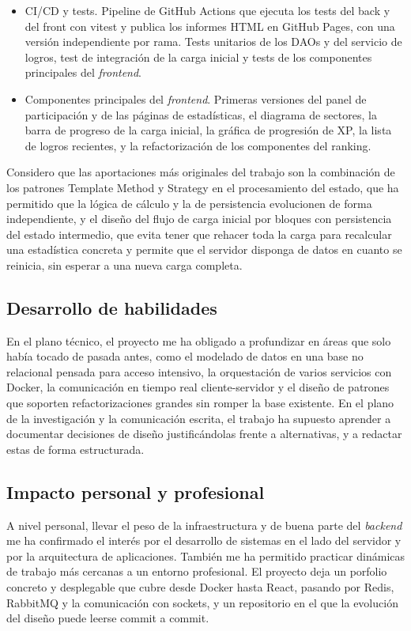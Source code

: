 \begin{itemize}
    \item CI/CD y tests. Pipeline de GitHub Actions que ejecuta los tests del back y del front con vitest y publica los informes HTML en GitHub Pages, con una versión independiente por rama. Tests unitarios de los DAOs y del servicio de logros, test de integración de la carga inicial y tests de los componentes principales del \textit{frontend}.
    \item Componentes principales del \textit{frontend}. Primeras versiones del panel de participación y de las páginas de estadísticas, el diagrama de sectores, la barra de progreso de la carga inicial, la gráfica de progresión de XP, la lista de logros recientes, y la refactorización de los componentes del ranking.
\end{itemize}

Considero que las aportaciones más originales del trabajo son la combinación de los patrones Template Method y Strategy en el procesamiento del estado, que ha permitido que la lógica de cálculo y la de persistencia evolucionen de forma independiente, y el diseño del flujo de carga inicial por bloques con persistencia del estado intermedio, que evita tener que rehacer toda la carga para recalcular una estadística concreta y permite que el servidor disponga de datos en cuanto se reinicia, sin esperar a una nueva carga completa.

\subsection*{Desarrollo de habilidades}

En el plano técnico, el proyecto me ha obligado a profundizar en áreas que solo había tocado de pasada antes, como el modelado de datos en una base no relacional pensada para acceso intensivo, la orquestación de varios servicios con Docker, la comunicación en tiempo real cliente-servidor y el diseño de patrones que soporten refactorizaciones grandes sin romper la base existente.
En el plano de la investigación y la comunicación escrita, el trabajo ha supuesto aprender a documentar decisiones de diseño justificándolas frente a alternativas, y a redactar estas de forma estructurada.

\subsection*{Impacto personal y profesional}

A nivel personal, llevar el peso de la infraestructura y de buena parte del \textit{backend} me ha confirmado el interés por el desarrollo de sistemas en el lado del servidor y por la arquitectura de aplicaciones. También me ha permitido practicar dinámicas de trabajo más cercanas a un entorno profesional. El proyecto deja un porfolio concreto y desplegable que cubre desde Docker hasta React, pasando por Redis, RabbitMQ y la comunicación con sockets, y un repositorio en el que la evolución del diseño puede leerse commit a commit.

